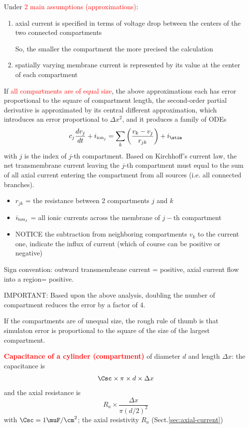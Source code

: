 Under \textcolor{red}{2 main assumptions (approximations)}:
\begin{enumerate}
  \item axial current is specified in terms of voltage drop between the centers
  of the two connected compartments
  
  So, the smaller the compartment the more precised the calculation
  
  \item spatially varying membrane current is represented by its value at the
  center of each compartment
\end{enumerate}
If \textcolor{red}{all compartments are of equal size}, the above approximations
each has error proportional to the square of compartment length, the
second-order partial derivative is approximated by its central different
approximation, which introduces an error proportional to $\Delta x^2$, and it
produces a family of ODEs
\begin{equation}
c_j \frac{dv_j}{dt } + i_{\ion_j} = \sum_k \left( \frac{v_k -
v_j}{r_{jk}}\right) + i_\stim
\end{equation}
with $j$ is the index of $j$-th compartment. Based on Kirchhoff's current law,
the net transmembrane current leaving the $j$-th compartment must equal to the
sum of all axial current entering the compartment from all sources (i.e. all
connected branches).
\begin{itemize}
  \item $r_{jk}$ = the resistance between 2 compartments $j$ and $k$
  \item $i_{{\text{ion}}_j}$ = all ionic currents across the membrane of $j-$th
  compartment
  \item NOTICE the subtraction from neighboring compartments $v_k$ to the
  current one, indicate the influx of current (which of course can be positive
  or negative)
\end{itemize}
Sign convention: outward transmembrane current = positive, axial current flow
into a region= positive.

IMPORTANT: Based upon the above analysis, doubling the number of compartment
reduces the error by a factor of 4. 

If the compartments are of unequal size, the rough rule of thumb is that
simulaton error is proportional to the square of the size of the largest
compartment.

\textcolor{red}{\bf Capacitance of a cylinder (compartment)} of diameter $d$ and
length $\Delta x$: the capacitance is 
\begin{equation}
\Csc \times \pi \times d \times \Delta
x
\end{equation}
and the axial resistance is 
\begin{equation}
R_a \times \frac{\Delta x}{\pi (d/2)^2} 
\end{equation}
with $\Csc = 1 \muF/\cm^2$; the axial resistivity $R_a$ (Sect.\ref{sec:axial-current})

